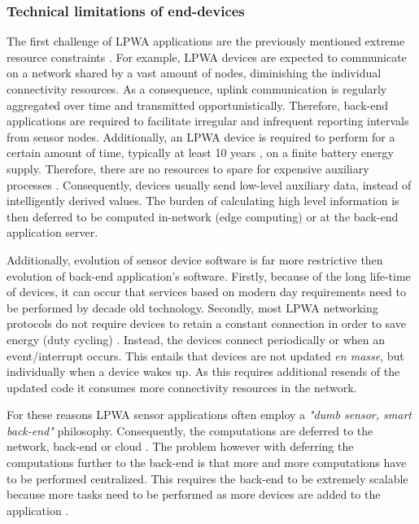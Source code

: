 \subsubsection{Technical limitations of end-devices}
The first challenge of LPWA applications are the previously mentioned extreme resource constraints \cite{key_features, value_of}. For example, LPWA devices are expected to communicate on a network shared by a vast amount of nodes, diminishing the individual connectivity resources. As a consequence, uplink communication is regularly aggregated over time and transmitted opportunistically. Therefore, back-end applications are required to facilitate irregular and infrequent reporting intervals from sensor nodes. Additionally, an LPWA device is required to perform for a certain amount of time, typically at least 10 years \cite{tmobile, vodafone, nbiot_vs_lora}, on a finite battery energy supply. Therefore, there are no resources to spare for expensive auxiliary processes \cite{energy_challenges}. Consequently, devices usually send low-level auxiliary data, instead of intelligently derived values. The burden of calculating high level information is then deferred to be computed in-network (edge computing) or at the back-end application server.

Additionally, evolution of sensor device software is far more restrictive then evolution of back-end application's software. Firstly, because of the long life-time of devices, it can occur that services based on modern day requirements need to be performed by decade old technology. Secondly, most LPWA networking protocols do not require devices to retain a constant connection in order to save energy (duty cycling) \cite{tmobile, vodafone, on_duty_cycling, energy_challenges}. Instead, the devices connect periodically or when an event/interrupt occurs. This entails that devices are not updated \emph{en masse}, but individually when a device wakes up. As this requires additional resends of the updated code it consumes more connectivity resources in the network. 

For these reasons LPWA sensor applications often employ a \emph{"dumb sensor, smart back-end"} philosophy. Consequently, the computations are deferred to the network, back-end or cloud \cite{popularity_applications_qos_moeilijk, defer_cloud}. The problem however with deferring the computations further to the back-end is that more and more computations have to be performed centralized. This requires the back-end to be extremely scalable because more tasks need to be performed as more devices are added to the application \cite{stream_requirements, iot_big_data_difficulties, qos_tradeoff}.


